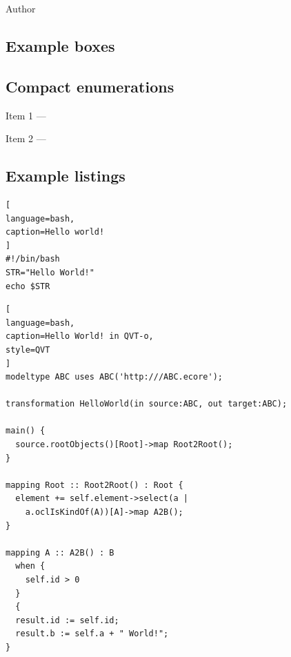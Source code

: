 \sspar

\begin{fancyquote}{Author}
\sspar
\end{fancyquote}

\subsection{Example boxes}

\sspar

\sspar
\exampleend

\sspar
\tipend

\sspar
\tnoteend

\subsection{Compact enumerations}

\sspar

\begin{itemizecompact}
  \item \sspar
  \item \sspar
\end{itemizecompact}

\sspar

\begin{enumeratecompact}
  \item \sspar
  \item \sspar
\end{enumeratecompact}

\sspar

\begin{descriptioncompact}
  \item [Item 1] --- \sspar
  \item [Item 2] --- \sspar
\end{descriptioncompact}

\subsection{Example listings}

\sspar

\begin{lstlisting}[
language=bash,
caption=Hello world! 
]
#!/bin/bash
STR="Hello World!"
echo $STR
\end{lstlisting}

\sspar

\begin{lstlisting}[
language=bash,
caption=Hello World! in QVT-o,
style=QVT
]
modeltype ABC uses ABC('http:///ABC.ecore');

transformation HelloWorld(in source:ABC, out target:ABC);

main() {
  source.rootObjects()[Root]->map Root2Root();
}

mapping Root :: Root2Root() : Root {
  element += self.element->select(a |
    a.oclIsKindOf(A))[A]->map A2B();
}

mapping A :: A2B() : B
  when {
    self.id > 0
  }
  {
  result.id := self.id;
  result.b := self.a + " World!";
}
\end{lstlisting}

